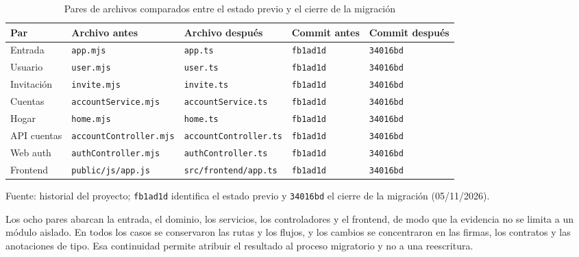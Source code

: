\documentclass[conference]{IEEEtran}
\begin{document}
\begin{table}[!t]
\caption{Pares de archivos comparados entre el estado previo y el cierre de la migración}
\label{tab:snapshots}
\centering
\scriptsize
\setlength{\tabcolsep}{1.5pt}
\begin{tabular}{@{}>{\raggedright\arraybackslash}p{1.25cm}>{\raggedright\arraybackslash}p{2.55cm}>{\raggedright\arraybackslash}p{2.55cm}>{\raggedright\arraybackslash}p{1.05cm}>{\raggedright\arraybackslash}p{1.05cm}@{}}
\toprule
Par & Archivo antes & Archivo después & Commit antes & Commit después \\
\midrule
Entrada & \texttt{app.mjs} & \texttt{app.ts} & \texttt{fb1ad1d} & \texttt{34016bd} \\
Usuario & \texttt{user.mjs} & \texttt{user.ts} & \texttt{fb1ad1d} & \texttt{34016bd} \\
Invitación & \texttt{invite.mjs} & \texttt{invite.ts} & \texttt{fb1ad1d} & \texttt{34016bd} \\
Cuentas & \texttt{accountService.mjs} & \texttt{accountService.ts} & \texttt{fb1ad1d} & \texttt{34016bd} \\
Hogar & \texttt{home.mjs} & \texttt{home.ts} & \texttt{fb1ad1d} & \texttt{34016bd} \\
API cuentas & \texttt{accountController}\allowbreak\texttt{.mjs} & \texttt{accountController}\allowbreak\texttt{.ts} & \texttt{fb1ad1d} & \texttt{34016bd} \\
Web auth & \texttt{authController}\allowbreak\texttt{.mjs} & \texttt{authController}\allowbreak\texttt{.ts} & \texttt{fb1ad1d} & \texttt{34016bd} \\
Frontend & \texttt{public/js/}\allowbreak\texttt{app.js} & \texttt{src/frontend/}\allowbreak\texttt{app.ts} & \texttt{fb1ad1d} & \texttt{34016bd} \\
\bottomrule
\end{tabular}

\vspace{2pt}
{\footnotesize Fuente: historial del proyecto; \texttt{fb1ad1d} identifica el
estado previo y \texttt{34016bd} el cierre de la migración (05/11/2026).}
\end{table}

Los ocho pares abarcan la entrada, el dominio, los servicios, los controladores
y el frontend, de modo que la evidencia no se limita a un módulo aislado. En
todos los casos se conservaron las rutas y los flujos, y los cambios se
concentraron en las firmas, los contratos y las anotaciones de tipo. Esa
continuidad permite atribuir el resultado al proceso migratorio y no a una
reescritura.
\end{document}
